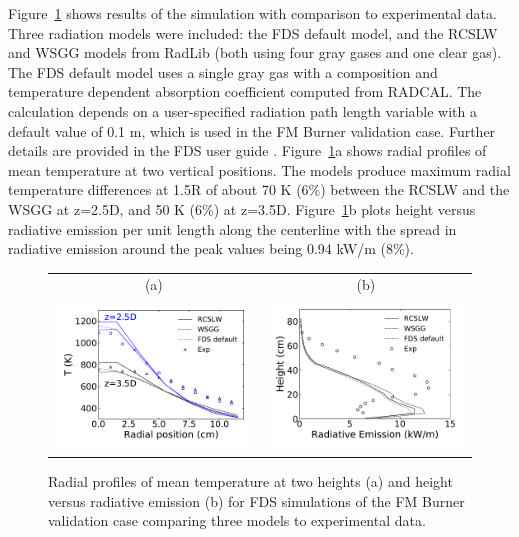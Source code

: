 \documentclass[preprint,12pt]{elsarticle}
\begin{document}
Figure~\ref{f:fds} shows results of the simulation with comparison to experimental data. Three radiation models were included: the FDS default model, and the RCSLW and WSGG models from RadLib (both using four gray gases and one clear gas).
The FDS default model uses a single gray gas with a composition and temperature dependent absorption coefficient computed from RADCAL. The calculation depends on a user-specified radiation path length variable with a default value of 0.1 m, which is used in the FM Burner validation case. Further details are provided in the FDS user guide \cite{FDS}. Figure~\ref{f:fds}a shows radial profiles of mean temperature at two vertical positions. The models produce maximum radial temperature differences at 1.5R of about 70 K (6\%) between the RCSLW and the WSGG at z=2.5D, and 50 K (6\%) at z=3.5D. 
Figure~\ref{f:fds}b plots height versus radiative emission per unit length along the centerline with the spread in radiative emission around the peak values being 0.94 kW/m (8\%).
%
\begin{figure}
\begin{center}
\begin{tabular}{c c}
(a) & (b) \\
\includegraphics[width=2.5 in]{fig_fds_T_mean.pdf} &
\includegraphics[width=2.5 in]{fig_fds_rad_mean.pdf}
\end{tabular}
\caption{Radial profiles of mean temperature at two heights (a) and height versus radiative emission (b) for FDS simulations of the FM Burner validation case comparing three models to experimental data.}
\label{f:fds}
\end{center}
\end{figure}
%
\end{document}
